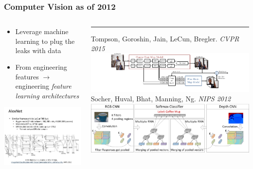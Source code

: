 \documentclass{beamer}
\begin{document}
\begin{frame}
\frametitle{Computer Vision as of 2012}
\begin{columns}[T] %
\begin{column}{.4\textwidth}
\begin{itemize} 
\item{Leverage machine learning to plug the leaks with data}
\item From engineering features $\rightarrow$ engineering \emph{feature learning architectures}   
\end{itemize} 
\includegraphics[scale=0.25]{./Figures/alexNet.jpg}
\end{column}%
\hfill%
\begin{column}{.6\textwidth}
\color{blue}\rule{\linewidth}{2pt}
\tiny{Tompson, Goroshin, Jain, LeCun, Bregler. \emph{CVPR 2015}}
\centering
\includegraphics[scale=0.4]{./Figures/network2.pdf} \\
\tiny{Socher, Huval, Bhat, Manning, Ng. \emph{NIPS 2012}}   
\includegraphics[scale=0.15]{./Figures/socher.png} \\

\end{column}
\end{columns}
\end{frame}
\end{document}
